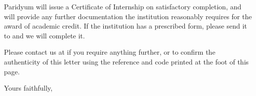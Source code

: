 \documentclass{paridyum}
\begin{document}
\vspace{0.7em}
Paridyum will issue a Certificate of Internship on satisfactory completion, and
will provide any further documentation the institution reasonably requires for
the award of academic credit. If the institution has a prescribed form, please
send it to \dkOrgEmail{} and we will complete it.

\vspace{0.7em}
Please contact us at \dkOrgEmail{} if you require anything further, or to
confirm the authenticity of this letter using the reference and code printed at
the foot of this page.

\vspace{1.2em}
Yours faithfully,

\vspace{1.2em}
\paridyumofficers{\dkSigCeoName}{\dkSigCeoDesignation}{\dkSigCtoName}{\dkSigCtoDesignation}
\end{document}
